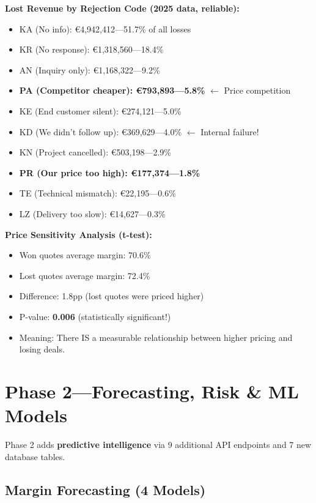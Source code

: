 \documentclass[11pt,a4paper]{article}
\newcommand{\EUR}{\euro{}}
\newcommand{\pp}{pp}
\begin{document}
\textbf{Lost Revenue by Rejection Code (2025 data, reliable):}
\begin{itemize}[nosep]
  \item KA (No info): \EUR4{,}942{,}412---51.7\% of all losses
  \item KR (No response): \EUR1{,}318{,}560---18.4\%
  \item AN (Inquiry only): \EUR1{,}168{,}322---9.2\%
  \item \textbf{PA (Competitor cheaper): \EUR793{,}893---5.8\%} $\leftarrow$ Price competition
  \item KE (End customer silent): \EUR274{,}121---5.0\%
  \item KD (We didn't follow up): \EUR369{,}629---4.0\% $\leftarrow$ Internal failure!
  \item KN (Project cancelled): \EUR503{,}198---2.9\%
  \item \textbf{PR (Our price too high): \EUR177{,}374---1.8\%}
  \item TE (Technical mismatch): \EUR22{,}195---0.6\%
  \item LZ (Delivery too slow): \EUR14{,}627---0.3\%
\end{itemize}

\textbf{Price Sensitivity Analysis (t-test):}
\begin{itemize}[nosep]
  \item Won quotes average margin: 70.6\%
  \item Lost quotes average margin: 72.4\%
  \item Difference: 1.8\pp{} (lost quotes were priced higher)
  \item P-value: \textbf{0.006} (statistically significant!)
  \item Meaning: There IS a measurable relationship between higher pricing and losing deals.
\end{itemize}

\section{Phase 2---Forecasting, Risk \& ML Models}

Phase 2 adds \textbf{predictive intelligence} via 9 additional API endpoints and 7 new database tables.

\subsection{Margin Forecasting (4 Models)}
\end{document}
